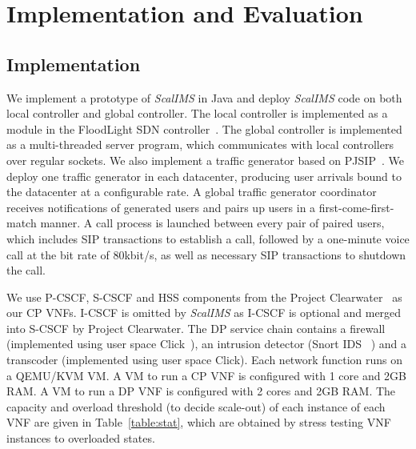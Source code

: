 \section{Implementation and Evaluation} \label{sec:scalims-evaluation}

\subsection{Implementation}

We implement a prototype of \textit{ScalIMS} in Java and deploy \textit{ScalIMS} code on both local controller and global controller. The local controller is implemented as a module in the FloodLight SDN controller~\cite{floodlight}. The global controller is implemented as a multi-threaded server program, which communicates with local controllers over regular sockets.  We also implement a traffic generator based on PJSIP~\cite{pjsip}. We deploy one traffic generator in each datacenter, producing user arrivals bound to the datacenter at a configurable rate. A global traffic generator coordinator receives notifications of generated users and pairs up users in a first-come-first-match manner. A call process is launched between every pair of paired users, which includes SIP transactions to establish a call, followed by a one-minute voice call at the bit rate of 80kbit/s, as well as necessary SIP transactions to shutdown the call.




We use P-CSCF, S-CSCF and HSS components from the Project Clearwater~\cite{project-clearwater} as our CP VNFs. I-CSCF is omitted by \textit{ScalIMS} as I-CSCF is optional and merged into S-CSCF by Project Clearwater. The DP service chain contains a firewall (implemented using user space Click~\cite{martins2014clickos}), an intrusion detector (Snort IDS ~\cite{snort}) and a transcoder (implemented using user space Click). Each network function runs on a QEMU/KVM VM. A VM to run a CP VNF is configured with 1 core and 2GB RAM. A VM to run a DP VNF is configured with 2 cores and 2GB RAM. The capacity and overload threshold (to decide scale-out) of each instance of each VNF are given in Table~\ref{table:stat}, which are obtained by stress testing VNF instances to overloaded states. %


